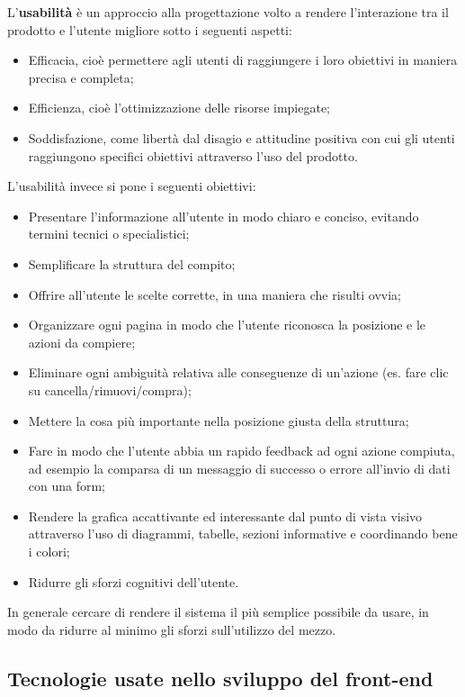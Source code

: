 L'\textbf{usabilità} è un approccio alla progettazione volto a rendere l'interazione tra il prodotto e l'utente migliore sotto i seguenti aspetti:
\begin{itemize}
    \item Efficacia, cioè permettere agli utenti di raggiungere i loro obiettivi in maniera precisa e completa;
    \item Efficienza, cioè l'ottimizzazione delle risorse impiegate;
    \item Soddisfazione, come libertà dal disagio e attitudine positiva con cui gli utenti raggiungono specifici obiettivi attraverso l’uso del prodotto.
\end{itemize}
L'usabilità invece si pone i seguenti obiettivi:
\begin{itemize}
    \item Presentare l'informazione all'utente in modo chiaro e conciso, evitando termini tecnici o specialistici;
    \item Semplificare la struttura del compito;
    \item Offrire all'utente le scelte corrette, in una maniera che risulti ovvia;
    \item Organizzare ogni pagina in modo che l'utente riconosca la posizione e le azioni da compiere;
    \item Eliminare ogni ambiguità relativa alle conseguenze di un'azione (es. fare clic su cancella/rimuovi/compra);
    \item Mettere la cosa più importante nella posizione giusta della struttura;
    \item Fare in modo che l'utente abbia un rapido feedback ad ogni azione compiuta, ad esempio la comparsa di un messaggio di successo o errore all'invio di dati con una form;
    \item Rendere la grafica accattivante ed interessante dal punto di vista visivo attraverso l'uso di diagrammi, tabelle, sezioni informative e coordinando bene i colori;
    \item Ridurre gli sforzi cognitivi dell'utente.
\end{itemize}
In generale cercare di rendere il sistema il più semplice possibile da usare, in modo da ridurre al minimo gli sforzi sull'utilizzo del mezzo.


\subsection{Tecnologie usate nello sviluppo del front-end}

